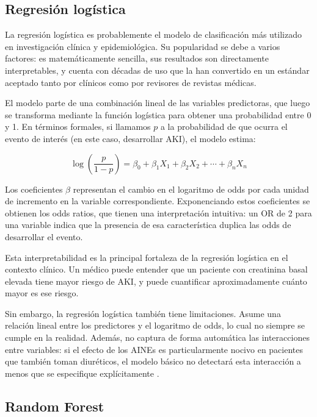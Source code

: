 \documentclass[12pt, a4paper, oneside]{report}
\begin{document}
\subsection{Regresión logística}

La regresión logística es probablemente el modelo de clasificación más utilizado en investigación clínica y epidemiológica. Su popularidad se debe a varios factores: es matemáticamente sencilla, sus resultados son directamente interpretables, y cuenta con décadas de uso que la han convertido en un estándar aceptado tanto por clínicos como por revisores de revistas médicas.

El modelo parte de una combinación lineal de las variables predictoras, que luego se transforma mediante la función logística para obtener una probabilidad entre 0 y 1. En términos formales, si llamamos $p$ a la probabilidad de que ocurra el evento de interés (en este caso, desarrollar AKI), el modelo estima:

\begin{equation}
\log\left(\frac{p}{1-p}\right) = \beta_0 + \beta_1 X_1 + \beta_2 X_2 + \cdots + \beta_n X_n
\end{equation}

Los coeficientes $\beta$ representan el cambio en el logaritmo de odds por cada unidad de incremento en la variable correspondiente. Exponenciando estos coeficientes se obtienen los odds ratios, que tienen una interpretación intuitiva: un OR de 2 para una variable indica que la presencia de esa característica duplica las odds de desarrollar el evento.

Esta interpretabilidad es la principal fortaleza de la regresión logística en el contexto clínico. Un médico puede entender que un paciente con creatinina basal elevada tiene mayor riesgo de AKI, y puede cuantificar aproximadamente cuánto mayor es ese riesgo.

Sin embargo, la regresión logística también tiene limitaciones. Asume una relación lineal entre los predictores y el logaritmo de odds, lo cual no siempre se cumple en la realidad. Además, no captura de forma automática las interacciones entre variables: si el efecto de los AINEs es particularmente nocivo en pacientes que también toman diuréticos, el modelo básico no detectará esta interacción a menos que se especifique explícitamente \parencite{hosmer2013logistic}.

\subsection{Random Forest}
\end{document}
